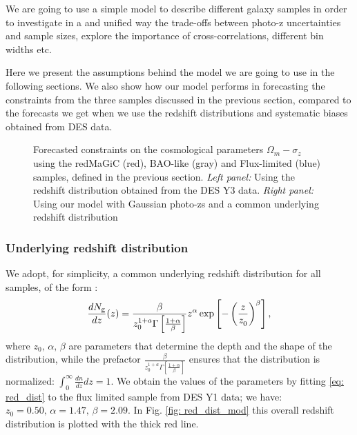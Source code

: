 \documentclass[a4paper,fleqn,usenatbib]{mnras}
\begin{document}
We are going to use a simple model to describe different galaxy samples in order to investigate in a and unified way the trade-offs between photo-z uncertainties and sample sizes, explore the importance of cross-correlations, different bin widths etc. 

Here we present the assumptions behind the model we are going to use in the following sections. We also show how our model performs in forecasting the constraints from the three samples discussed in the previous section, compared to the forecasts we get when we use the redshift distributions and systematic biases obtained from DES data.

\begin{figure*}
\centering
{}%
{}%
\caption{ Forecasted constraints on the cosmological parameters $\Omega_m - \sigma_z$ using the redMaGiC (red), BAO-like (gray)
and Flux-limited (blue) samples, defined in the previous section. {\textit{Left panel:}} Using the redshift distribution obtained from the DES Y3 data. {\textit{Right panel:}} Using our model with Gaussian photo-zs and a common underlying redshift distribution}
\label{fig: Data_and_model}
\end{figure*}


\subsubsection{Underlying redshift distribution}

We adopt, for simplicity, a common underlying  redshift distribution for all samples, of the form \citep{Efstathiou1991, Smail1994}:
\begin{equation}
\label{eq: red_dist}
\frac{dN_{\mbox{\scriptsize{g}}}}{dz}(z) = \frac{\beta}{z_0^{1+a}\Gamma\left[ \frac{1+ \alpha}{\beta}\right]}z^\alpha \exp \left[-\left( \frac{z	}{z_{0}^{}}\right)^\beta \right],
\end{equation}
where $z_0, \,\alpha,\, \beta$ are parameters that determine the depth and the shape of the distribution, while the prefactor $ \frac{\beta}{z_0^{1+a}\Gamma\left[ \frac{1+ \alpha}{\beta}\right]}$ ensures that the distribution is normalized: $\int_0^{\infty} \frac{dn}{dz}dz = 1$. We obtain the values of the parameters by fitting \eqref{eq: red_dist} to the flux limited sample from DES Y1 data; we have: $z_0 = 0.50, \, \alpha=1.47, \, \beta = 2.09$. In Fig. \ref{fig: red_dist_mod}  this overall redshift distribution is plotted with the thick red line.
\end{document}
